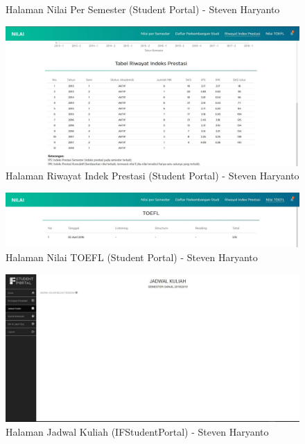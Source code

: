\begin{itemize}
\begin{enumerate}
\begin{figure}[H]
			\caption{Halaman Nilai Per Semester (Student Portal) - Steven Haryanto}
			\label{fig:2013_1_nps_studentportal}
		\end{figure}
		\begin{figure}[H]
			\centering
			\includegraphics[scale=0.4]{Gambar/HasilPengujian/2013_1_rip_studentportal}
			\caption{Halaman Riwayat Indek Prestasi (Student Portal) - Steven Haryanto}
			\label{fig:2013_1_rip_studentportal}
		\end{figure}
		\begin{figure}[H]
			\centering
			\includegraphics[scale=0.4]{Gambar/HasilPengujian/2013_1_toefl_studentportal}
			\caption{Halaman Nilai TOEFL (Student Portal) - Steven Haryanto}
			\label{fig:2013_1_toefl_studentportal}
		\end{figure}
		\begin{figure}[H]
			\centering
			\includegraphics[scale=0.325]{Gambar/HasilPengujian/2013_1_jadwal_kuliah_ifstudentportal}
			\caption{Halaman Jadwal Kuliah (IFStudentPortal) - Steven Haryanto}

\end{figure}
\end{enumerate}
\end{itemize}
